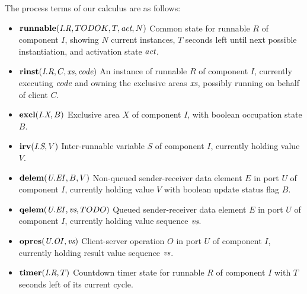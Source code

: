 \documentclass[twocolumn]{article}
\begin{document}
The process terms of our calculus are as follows:
\begin{itemize}
\item $\runnable{\Tr{R}{I}}{TODOK}{T}{\Act}{N}$  \newline
Common state for runnable $R$ of component $I$, showing $N$ current instances, $T$ seconds left until next possible instantiation, and activation state $\Act$.
\item $\rinst{\Tr{R}{I}}{C}{\Xs}{\Code}$ \newline
An instance of runnable $R$ of component $I$, currently executing $\Code$ and owning the exclusive areas $\Xs$, possibly running on behalf of client $C$.
\item $\excl{\Tx{X}{I}}{B}$ \newline
Exclusive area $X$ of component $I$, with boolean occupation state $B$.
\item $\irv{\Ts{S}{I}}{V}$ \newline
Inter-runnable variable $S$ of component $I$, currently holding value $V$.
\item $\delem{\Te{E}{U}{I}}{B}{V}$ \newline
Non-queued sender-receiver data element $E$ in port $U$ of component $I$, currently holding value $V$ with boolean update status flag $B$.
\item $\qelem{\Te{E}{U}{I}}{\Vs}{TODO}$ \newline
Queued sender-receiver data element $E$ in port $U$ of component $I$, currently holding value sequence $\Vs$.
\item $\opres{\To{O}{U}{I}}{\Vs}$ \newline
Client-server operation $O$ in port $U$ of component $I$, currently holding result value sequence $\Vs$.
\item $\timer{\Tr{R}{I}}{T}$ \newline  %
Countdown timer state for runnable $R$ of component $I$ with $T$ seconds left of its current cycle.
\end{itemize}
\end{document}
